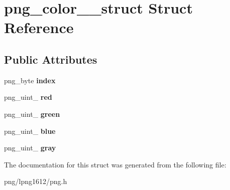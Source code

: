 \hypertarget{structpng__color__16__struct}{\section{png\+\_\+color\+\_\+\_\+struct Struct Reference}
\label{structpng__color__16__struct}
}
\subsection*{Public Attributes}
\begin{DoxyCompactItemize}
\item 
\hypertarget{structpng__color__16__struct_a44a918da0d9a50cf94fcad5a3c741ee0}{png\+\_\+byte {\bfseries index}}\label{structpng__color__16__struct_a44a918da0d9a50cf94fcad5a3c741ee0}

\item 
\hypertarget{structpng__color__16__struct_a069bad345aefbe4eab29fcc1d8af91e6}{png\+\_\+uint\+\_ {\bfseries red}}\label{structpng__color__16__struct_a069bad345aefbe4eab29fcc1d8af91e6}

\item 
\hypertarget{structpng__color__16__struct_af01259ffd46c78eff9b1ad584a295126}{png\+\_\+uint\+\_ {\bfseries green}}\label{structpng__color__16__struct_af01259ffd46c78eff9b1ad584a295126}

\item 
\hypertarget{structpng__color__16__struct_afd68833319d436582aa5911de7cdd46b}{png\+\_\+uint\+\_ {\bfseries blue}}\label{structpng__color__16__struct_afd68833319d436582aa5911de7cdd46b}

\item 
\hypertarget{structpng__color__16__struct_a660a572a0a2f4094408f2fecb61571ac}{png\+\_\+uint\+\_ {\bfseries gray}}\label{structpng__color__16__struct_a660a572a0a2f4094408f2fecb61571ac}

\end{DoxyCompactItemize}


The documentation for this struct was generated from the following file\+:\begin{DoxyCompactItemize}
\item 
png/lpng1612/png.\+h\end{DoxyCompactItemize}
